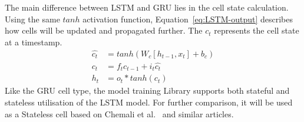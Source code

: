 The main difference between LSTM and GRU lies in the cell state calculation.
Using the same $tanh$ activation function, Equation~\ref{eq:LSTM-output} describes how cells will be updated and propagated further.
The $c_t$ represents the cell state at a timestamp.
\begin{equation}
    \begin{split}
        \hat{c_t} &= tanh \left(W_c \left[h_{t-1}, x_t \right] + b_c \right) \\
              c_t &= f_t c_{t-1}+i_t \hat{c_t} \\
              h_t &= o_t*tanh \left(c_t \right)
    \end{split}
    \label{eq:LSTM-output}
\end{equation}
Like the GRU cell type, the model training Library supports both stateful and stateless utilisation of the LSTM model.
For further comparison, it will be used as a Stateless cell based on Chemali et al.~\cite{Chemali2017} and similar articles.
%
%
